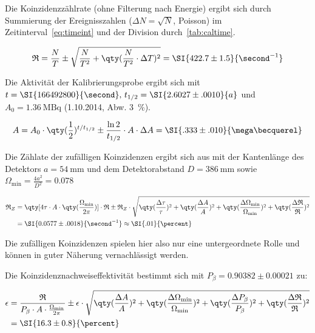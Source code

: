 \documentclass[slug=PET, room=Andreas-Schubert-Bau\,\ 424A, supervisor=Carsten\ Bittrich, coursedate=10.\ 01.\ 2020]{../../Lab_Report_LaTeX/lab_report}
\begin{document}
Die Koinzidenzz\"ahlrate (ohne Filterung nach Energie) ergibt sich
durch Summierung der Ereignisszahlen (\(\Delta N = \sqrt{N}\),
Poisson) im Zeitinterval~\eqref{eq:timeint} und der Division
durch~\eqref{tab:caltime}.

\begin{equation}
  \label{eq:ctrate}
  \mathfrak{R} = \frac{N}{T} \pm \sqrt{\frac{N}{T^2} +
    \qty(\frac{N}{T^2}\cdot \Delta T)^2} = \SI{422.7\pm 1.5}{\second^{-1}}
\end{equation}

Die Aktivität der  Kalibrierungsprobe ergibt sich mit
\(t=\SI{166492800}{\second},\, t_{1/2} = \SI{2.6027\pm .0010}{a}\) und \(A_0
= \SI{1.36}{\mega\becquerel}\) (1.10.2014, Abw. \SI{3}{\percent}).

\begin{equation}
  \label{eq:acttoday}
  A = A_0\cdot \qty(\frac{1}{2})^{t/t_{1/2}} \pm
  \frac{\ln{2}}{t_{1/2}}\cdot A\cdot\Delta A = \SI{.333\pm.010}{\mega\becquerel}
\end{equation}

Die Z\"ahlate der zuf\"alligen Koinzidenzen ergibt sich aus
mit der Kantenl\"ange des Detektors
\(a=\SI{54}{\milli\meter}\) und dem Detektorabstand
\(D=\SI{386}{\milli\meter}\) sowie
\(\Omega_{\min} = \frac{4a^2}{D^2} = 0.078\)

\begin{align}
  \label{eq:incidentalrate}
  \mathfrak{R}_Z &= \qty[4\tau\cdot A\cdot
  \qty(\frac{\Omega_{\min}}{2\pi})]\cdot \mathfrak{R} \pm \mathfrak{R}_Z\cdot
  \sqrt{\qty(\frac{\Delta\tau}{\tau})^2 + \qty(\frac{\Delta A}{A})^2 +
    \qty(\frac{\Delta\Omega_{\min}}{\Omega_{\min}})^2 +
                   \qty(\frac{\Delta\mathfrak{R}}{\mathfrak{R}})^2} \\
                 &= \SI{0.0577\pm .0018}{\second^{-1}} \approx \SI{.01}{\percent}
\end{align}

Die zuf\"alligen Koinzidenzen spielen hier also nur eine
untergeordnete Rolle und k\"onnen in guter N\"aherung vernachl\"assigt
werden.

Die Koinzidenznachweiseffektivit\"at bestimmt sich
mit \(P_\beta = 0.90382\pm 0.00021\) zu:

\begin{align}
  \epsilon & = \frac{\mathfrak{R}}{P_\beta\cdot A \cdot
  \frac{\Omega_{\min}}{2\pi}} \pm \epsilon\cdot\sqrt{\qty(\frac{\Delta A}{A})^2 +
  \qty(\frac{\Delta\Omega_{\min}}{\Omega_{\min}})^2 +
  \qty(\frac{\Delta P_\beta}{P_\beta})^2 +
             \qty(\frac{\Delta\mathfrak{R}}{\mathfrak{R}})^2} \\
  & = \SI{16.3\pm 0.8}{\percent}
\end{align}
\end{document}
